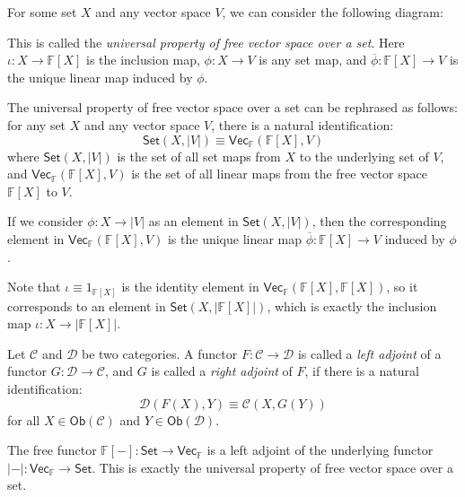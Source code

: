 \documentclass[
	11pt, %
	fleqn, %
	a4paper, %
]{LegrandOrangeBook}
\renewcommand{\bar}[1]{\overline{#1}} %
\newcommand{\F}{\mathbb{F}} %
\newcommand{\C}{\mathcal{C}} %
\newcommand{\D}{\mathcal{D}} %
\newcommand{\Set}{\boldsymbol{\mathsf{Set}}} %
\newcommand{\Vect}{\boldsymbol{\mathsf{Vec}}} %
\newcommand{\Ob}[1]{\mathsf{Ob}(#1)} %
\begin{document}
For some set $X$ and any vector space $V$, we can consider the following diagram:
\begin{center}
\end{center}
This is called the \emph{universal property of free vector space over a set}. Here $\iota : X \to \F[X]$ is the inclusion map, $\phi : X \to V$ is any set map, and $\bar{\phi} : \F[X] \to V$ is the unique linear map induced by $\phi$.
\begin{remark}
    The universal property of free vector space over a set can be rephrased as follows: for any set $X$ and any vector space $V$, there is a natural identification:
    \[
        \Set(X, |V|) \equiv \Vect_{\F}(\F[X], V)
    \]
    where $\Set(X, |V|)$ is the set of all set maps from $X$ to the underlying set of $V$, and $\Vect_{\F}(\F[X], V)$ is the set of all linear maps from the free vector space $\F[X]$ to $V$.
    
    If we consider $\phi : X \to |V|$ as an element in $\Set(X, |V|)$, then the corresponding element in $\Vect_{\F}(\F[X], V)$ is the unique linear map $\bar{\phi} : \F[X] \to V$ induced by $\phi$.

    Note that $\iota \equiv 1_{\F[X]}$ is the identity element in $\Vect_{\F}(\F[X], \F[X])$, so it corresponds to an element in $\Set(X, |\F[X]|)$, which is exactly the inclusion map $\iota : X \to |\F[X]|$.
\end{remark}

\begin{definition}
    Let $\C$ and $\D$ be two categories. A functor $F : \C \to \D$ is called a \emph{left adjoint} of a functor $G : \D \to \C$, and $G$ is called a \emph{right adjoint} of $F$, if there is a natural identification:
    \[
        \D(F(X), Y) \equiv \C(X, G(Y))
    \]
    for all $X \in \Ob{\C}$ and $Y \in \Ob{\D}$.
\end{definition}

\begin{example}
    The free functor $\F[-] : \Set \to \Vect_{\F}$ is a left adjoint of the underlying functor $|-| : \Vect_{\F} \to \Set$. This is exactly the universal property of free vector space over a set.
\end{example}
\end{document}
